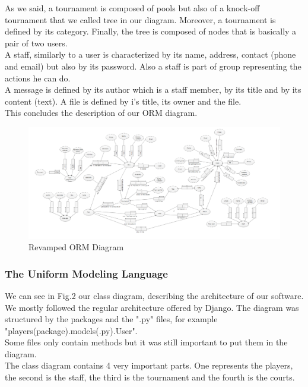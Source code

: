 \documentclass[a4paper, 12pt]{article}
\begin{document}
As we said, a tournament is composed of pools but also of a knock-off tournament that we called tree in our diagram. Moreover, a tournament is defined by its category. Finally, the tree is composed of nodes that is basically a pair of two users.\\

A staff, similarly to a user is characterized by its name, address, contact (phone and email) but also by its password. Also a staff is part of group representing the actions he can do. \\

A message is defined by its author which is a staff member, by its title and by its content (text). A file is defined by i's title, its owner and the file.\\

This concludes the description of our ORM diagram. 

\begin{figure}[ht!]
\caption{\label{orm2} Revamped ORM Diagram}
\includegraphics[scale=0.60, angle=90]{ormp2.PNG}
\end{figure}
\FloatBarrier


\subsubsection{The Uniform Modeling Language}
We can see in Fig.2 our class diagram, describing the architecture of our software. We mostly followed the regular architecture offered by Django. The diagram was structured by the packages and the ".py" files, for example "players(package).models(.py).User".\\

Some files only contain methods but it was still important to put them in the diagram.\\

The class diagram contains 4 very important parts. One represents the players, the second is the staff, the third is the tournament and the fourth is the courts.\\
\end{document}

